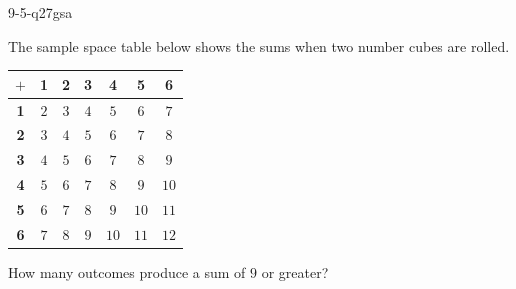 \begin{practiceQuestion}{9-5-q27}{gsa}
\begin{questionText}
The sample space table below shows the sums when two number cubes are rolled.

\begin{center}
\begin{tabular}{c|cccccc}
$+$ & \textbf{1} & \textbf{2} & \textbf{3} & \textbf{4} & \textbf{5} & \textbf{6} \\
\hline
\textbf{1} & $2$ & $3$ & $4$ & $5$ & $6$ & $7$ \\
\textbf{2} & $3$ & $4$ & $5$ & $6$ & $7$ & $8$ \\
\textbf{3} & $4$ & $5$ & $6$ & $7$ & $8$ & $9$ \\
\textbf{4} & $5$ & $6$ & $7$ & $8$ & $9$ & $10$ \\
\textbf{5} & $6$ & $7$ & $8$ & $9$ & $10$ & $11$ \\
\textbf{6} & $7$ & $8$ & $9$ & $10$ & $11$ & $12$ \\
\end{tabular}
\end{center}

How many outcomes produce a sum of $9$ or greater?
\end{questionText}
\end{practiceQuestion}
